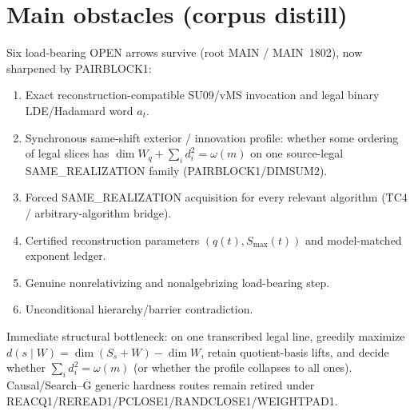 \documentclass[11pt]{article}
\begin{document}
\section*{Main obstacles (corpus distill)}
Six load-bearing OPEN arrows survive (root MAIN / MAIN~1802), now sharpened by PAIRBLOCK1:
\begin{enumerate}
\item Exact reconstruction-compatible SU09/vMS invocation and legal binary LDE/Hadamard word $a_t$.
\item Synchronous same-shift exterior / innovation profile: whether some ordering of legal slices has
$\dim W_q+\sum_i d_i^2=\omega(m)$ on one source-legal SAME\_REALIZATION family
(PAIRBLOCK1/DIMSUM2).
\item Forced SAME\_REALIZATION acquisition for every relevant algorithm (TC4 / arbitrary-algorithm bridge).
\item Certified reconstruction parameters $(q(t),S_{\max}(t))$ and model-matched exponent ledger.
\item Genuine nonrelativizing and nonalgebrizing load-bearing step.
\item Unconditional hierarchy/barrier contradiction.
\end{enumerate}
Immediate structural bottleneck: on one transcribed legal line, greedily maximize
$d(s\mid W)=\dim(S_s+W)-\dim W$, retain quotient-basis lifts, and decide whether
$\sum_i d_i^2=\omega(m)$ (or whether the profile collapses to all ones).
Causal/Search--G generic hardness routes remain retired under REACQ1/REREAD1/PCLOSE1/RANDCLOSE1/WEIGHTPAD1.
\end{document}
